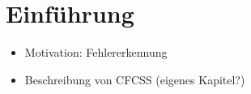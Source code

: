 \section{Einführung}

\begin{leftbar}
  \begin{itemize}
    \item Motivation: Fehlererkennung
    \item Beschreibung von CFCSS (eigenes Kapitel?)
  \end{itemize}
\end{leftbar}
